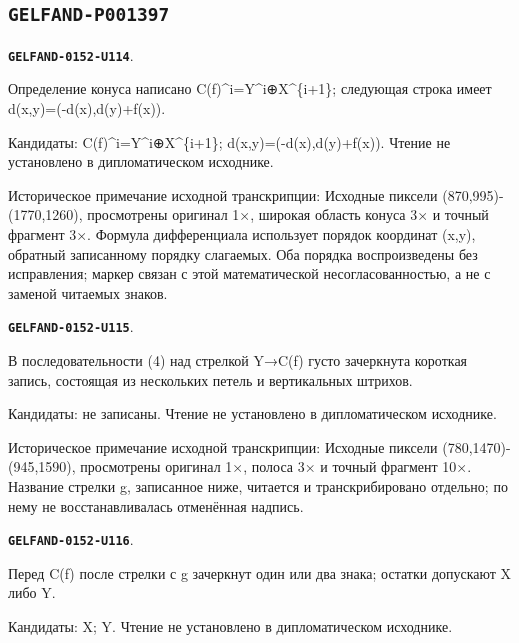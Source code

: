 \documentclass[11pt]{article}
\theoremstyle{definition}
\theoremstyle{remark}
\begin{document}
\subsection*{\texttt{GELFAND-P001397}}
\par\noindent\leavevmode{}\label{GELFAND-0152-U114}\label{GELFAND-P001397:cone-coordinate-order:note}\textbf{\texttt{GELFAND-0152-U114}}.\nopagebreak[4]\par
Определение конуса написано C(f)\textasciicircum{}i=Y\textasciicircum{}i⊕X\textasciicircum{}\{i+1\}; следующая строка имеет d(x,y)=(-d(x),d(y)+f(x)).\par
Кандидаты: C(f)\textasciicircum{}i=Y\textasciicircum{}i⊕X\textasciicircum{}\{i+1\}; d(x,y)=(-d(x),d(y)+f(x)). Чтение не установлено в дипломатическом исходнике.\par
Историческое примечание исходной транскрипции: Исходные пиксели (870,995)-(1770,1260), просмотрены оригинал 1×, широкая область конуса 3× и точный фрагмент 3×. Формула дифференциала использует порядок координат (x,y), обратный записанному порядку слагаемых. Оба порядка воспроизведены без исправления; маркер связан с этой математической несогласованностью, а не с заменой читаемых знаков.\par\medskip
\par\noindent\leavevmode{}\label{GELFAND-0152-U115}\label{GELFAND-P001397:sequence-arrow-cancellation:note}\textbf{\texttt{GELFAND-0152-U115}}.\nopagebreak[4]\par
В последовательности (4) над стрелкой Y→C(f) густо зачеркнута короткая запись, состоящая из нескольких петель и вертикальных штрихов.\par
Кандидаты: не записаны. Чтение не установлено в дипломатическом исходнике.\par
Историческое примечание исходной транскрипции: Исходные пиксели (780,1470)-(945,1590), просмотрены оригинал 1×, полоса 3× и точный фрагмент 10×. Название стрелки g, записанное ниже, читается и транскрибировано отдельно; по нему не восстанавливалась отменённая надпись.\par\medskip
\par\noindent\leavevmode{}\label{GELFAND-0152-U116}\label{GELFAND-P001397:sequence-object-cancellation:note}\textbf{\texttt{GELFAND-0152-U116}}.\nopagebreak[4]\par
Перед C(f) после стрелки с g зачеркнут один или два знака; остатки допускают X либо Y.\par
Кандидаты: X; Y. Чтение не установлено в дипломатическом исходнике.\par
\end{document}
